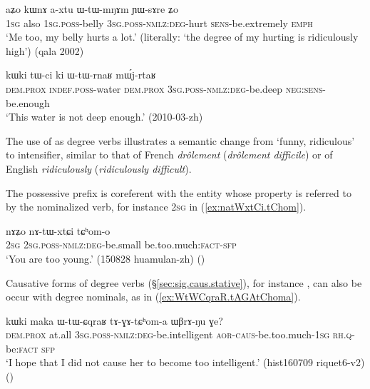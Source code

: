 \begin{exe}
\ex \label{ex:axtu.WtWmNAm}
\gll aʑo kɯnɤ a-xtu ɯ-tɯ-mŋɤm ɲɯ-sɤre ʑo \\
\textsc{1sg} also \textsc{1sg}.\textsc{poss}-belly \textsc{3sg}.\textsc{poss}-\textsc{nmlz}:\textsc{deg}-hurt \textsc{sens}-be.extremely \textsc{emph} \\
\glt `Me too, my belly hurts a lot.' (literally: `the degree of my hurting is ridiculously high') (qala 2002)
\end{exe}

\begin{exe}
\ex \label{ex:WtWrnaR.mWjrtaR}
\gll kɯki tɯ-ci ki ɯ-tɯ-rnaʁ mɯ́j-rtaʁ \\
\textsc{dem}.\textsc{prox} \textsc{indef}.\textsc{poss}-water \textsc{dem}.\textsc{prox} \textsc{3sg}.\textsc{poss}-\textsc{nmlz}:\textsc{deg}-be.deep \textsc{neg}:\textsc{sens}-be.enough \\
\glt `This water is not deep enough.' (2010-03-zh)
\end{exe}

The use of  as degree verbs illustrates a semantic change from `funny, ridiculous' to intensifier, similar to that of French \textit{drôlement} (\textit{drôlement difficile}) or of English \textit{ridiculously} (\textit{ridiculously difficult}).

The possessive prefix is coreferent with the entity whose property is referred to by the nominalized verb, for instance \textsc{2sg} in (\ref{ex:natWxtCi.tChom}). 

\begin{exe}
\ex \label{ex:natWxtCi.tChom}
\gll nɤʑo nɤ-tɯ-xtɕi tɕʰom-o \\
\textsc{2sg} \textsc{2sg}.\textsc{poss}-\textsc{nmlz}:\textsc{deg}-be.small be.too.much:\textsc{fact}-\textsc{sfp} \\
\glt `You are too young.' (150828 huamulan-zh)
()
\end{exe}

Causative forms of degree verbs (§\ref{sec:sig.caus.stative}), for instance , can also be occur with degree nominals, as in (\ref{ex:WtWCqraR.tAGAtChoma}).

\begin{exe}
\ex \label{ex:WtWCqraR.tAGAtChoma}
\gll kɯki maka ɯ-tɯ-ɕqraʁ tɤ-ɣɤ-tɕʰom-a ɯβrɤ-ŋu ɣe? \\
\textsc{dem}.\textsc{prox} at.all  \textsc{3sg}.\textsc{poss}-\textsc{nmlz}:\textsc{deg}-be.intelligent \textsc{aor}-\textsc{caus}-be.too.much-\textsc{1sg} \textsc{rh}.\textsc{q}-be:\textsc{fact} \textsc{sfp} \\
\glt `I hope that I did not cause her to become too intelligent.' (hist160709 riquet6-v2)
()
\end{exe}


